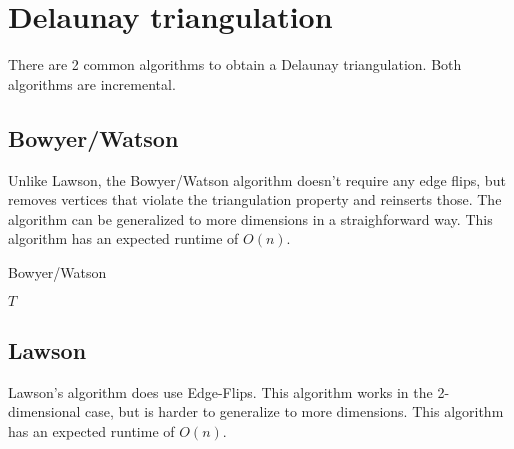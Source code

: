 \section{Delaunay triangulation}
\label{sec:triangulation}

There are 2 common algorithms to obtain a Delaunay triangulation.
Both algorithms are incremental.

\subsection{Bowyer/Watson}
\label{sub:bowyer_watson}

Unlike Lawson, the Bowyer/Watson algorithm doesn't require any edge flips, but removes vertices that violate the triangulation property and reinserts those.
The algorithm can be generalized to more dimensions in a straighforward way.
This algorithm has an expected runtime of $O(n)$.
\cite{shewchuk}

\begin{algorithm}
    \caption{Bowyer/Watson}
    \begin{algorithmic}
            \EndFor
            \Return $T$
        \EndFunction
    \end{algorithmic}
\end{algorithm}


\subsection{Lawson}
\label{sub:lawson}

Lawson's algorithm does use Edge-Flips.
This algorithm works in the 2-dimensional case, but is harder to generalize to more dimensions.
This algorithm has an expected runtime of $O(n)$.
\cite{shewchuk}


